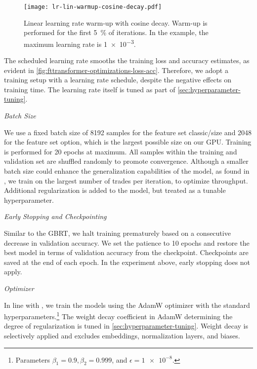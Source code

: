 \begin{figure}[!ht]
    \centering
    \texttt{[image: lr-lin-warmup-cosine-decay.pdf]}
    \caption[Linear Learning Rate Warm-Up With Cosine Decay]{Linear learning rate warm-up with cosine decay. Warm-up is performed for the first \SI{5}{\percent} of iterations. In the example, the maximum learning rate is \num{1e-3}.}
    \label{fig:lr-lin-warmup-cosine-decay}
\end{figure}

The scheduled learning rate smooths the training loss and accuracy estimates, as evident in \cref{fig:fttransformer-optimizations-loss-acc}. Therefore, we adopt a training setup with a learning rate schedule, despite the negative effects on training time. The learning rate itself is tuned as part of \cref{sec:hyperparameter-tuning}.

\emph{Batch Size}

We use a fixed batch size of \num{8192} samples for the feature set classic/size and \num{2048} for the feature set option, which is the largest possible size on our \gls{GPU}. Training is performed for \num{20} epochs at maximum. All samples within the training and validation set are shuffled randomly to promote convergence. Although a smaller batch size could enhance the generalization capabilities of the model, as found in \textcite[][3]{keskarLargeBatchTrainingDeep2017}, we train on the largest number of trades per iteration, to optimize throughput. Additional regularization is added to the model, but treated as a tunable hyperparameter.

\emph{Early Stopping and Checkpointing}

Similar to the \gls{GBRT}, we halt training prematurely based on a consecutive decrease in validation accuracy. We set the patience to \num{10} epochs and restore the best model in terms of validation accuracy from the checkpoint. Checkpoints are saved at the end of each epoch. In the experiment above, early stopping does not apply.

\emph{Optimizer}

In line with \textcite[][18937]{gorishniyRevisitingDeepLearning2021}, we train the models using the AdamW optimizer \autocite[][2--3]{loshchilovDecoupledWeightDecay2019} with the standard hyperparameters.\footnote{Parameters $\beta_{1}=0.9, \beta_{2}=0.999$, and $\epsilon = \num{1e-8}$.} The weight decay coefficient in AdamW determining the degree of regularization is tuned in \cref{sec:hyperparameter-tuning}. Weight decay is selectively applied and excludes embeddings, normalization layers, and biases.

